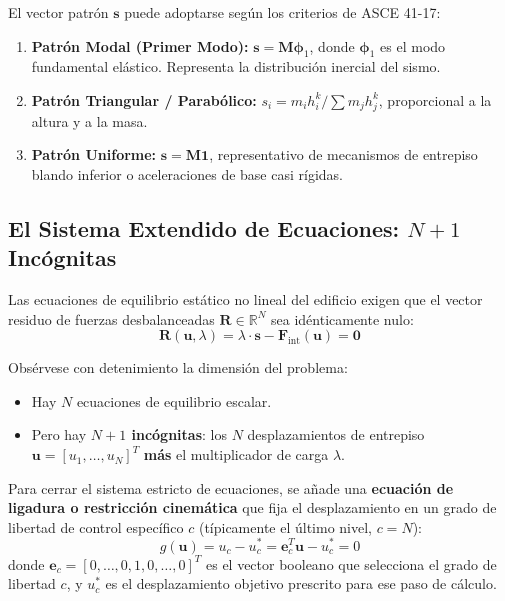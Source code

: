 \documentclass[11pt,letterpaper]{article}
\begin{document}
El vector patrón $\mathbf{s}$ puede adoptarse según los criterios de ASCE 41-17:
\begin{enumerate}
    \item \textbf{Patrón Modal (Primer Modo):} $\mathbf{s} = \mathbf{M} \bm{\phi}_1$, donde $\bm{\phi}_1$ es el modo fundamental elástico. Representa la distribución inercial del sismo.
    \item \textbf{Patrón Triangular / Parabólico:} $s_i = m_i h_i^k / \sum m_j h_j^k$, proporcional a la altura y a la masa.
    \item \textbf{Patrón Uniforme:} $\mathbf{s} = \mathbf{M} \mathbf{1}$, representativo de mecanismos de entrepiso blando inferior o aceleraciones de base casi rígidas.
\end{enumerate}

\subsection{El Sistema Extendido de Ecuaciones: \texorpdfstring{$N+1$}{N+1} Incógnitas}

Las ecuaciones de equilibrio estático no lineal del edificio exigen que el vector residuo de fuerzas desbalanceadas $\mathbf{R} \in \mathbb{R}^N$ sea idénticamente nulo:
\begin{equation}
    \mathbf{R}(\mathbf{u}, \lambda) = \lambda \cdot \mathbf{s} - \mathbf{F}_{\text{int}}(\mathbf{u}) = \mathbf{0}
    \label{eq:equilibrio_mdof}
\end{equation}

Obsérvese con detenimiento la dimensión del problema:
\begin{itemize}
    \item Hay $N$ ecuaciones de equilibrio escalar.
    \item Pero hay \textbf{$N+1$ incógnitas}: los $N$ desplazamientos de entrepiso $\mathbf{u} = [u_1, \dots, u_N]^T$ \textbf{más} el multiplicador de carga $\lambda$.
\end{itemize}

Para cerrar el sistema estricto de ecuaciones, se añade una \textbf{ecuación de ligadura o restricción cinemática} que fija el desplazamiento en un grado de libertad de control específico $c$ (típicamente el último nivel, $c = N$):
\begin{equation}
    g(\mathbf{u}) = u_c - u_c^* = \mathbf{e}_c^T \mathbf{u} - u_c^* = 0
    \label{eq:ligadura_control}
\end{equation}
donde $\mathbf{e}_c = [0, \dots, 0, 1, 0, \dots, 0]^T$ es el vector booleano que selecciona el grado de libertad $c$, y $u_c^*$ es el desplazamiento objetivo prescrito para ese paso de cálculo.
\end{document}
